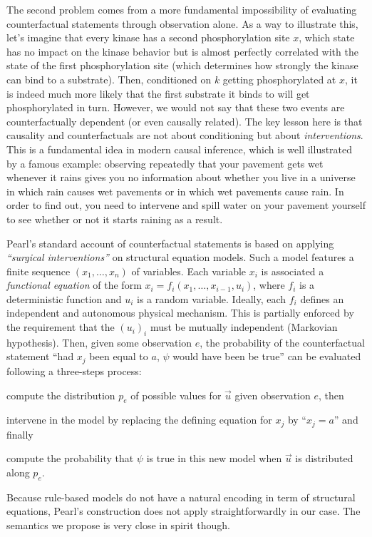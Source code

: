The second problem comes from a more fundamental impossibility of
evaluating counterfactual statements through observation alone. As a
way to illustrate this, let's imagine that every kinase has a second
phosphorylation site $x$, which state has no impact on the kinase
behavior but is almost perfectly correlated with the state of the
first phosphorylation site (which determines how strongly the kinase
can bind to a substrate). Then, conditioned on $k$ getting
phosphorylated at $x$, it is indeed much more likely that the first
substrate it binds to will get phosphorylated in turn. However, we
would not say that these two events are counterfactually dependent (or
even causally related). The key lesson here is that causality and
counterfactuals are not about conditioning but about
\emph{interventions}. This is a fundamental idea in modern causal
inference, which is well illustrated by a famous example: observing
repeatedly that your pavement gets wet whenever it rains gives you no
information about whether you live in a universe in which rain causes
wet pavements or in which wet pavements cause rain. In order to find
out, you need to intervene and spill water on your pavement yourself
to see whether or not it starts raining as a result.

Pearl's standard account of counterfactual statements is based on
applying \textit{``surgical interventions''} on structural equation
models. Such a model features a finite sequence $(x_1, \dots, x_n)$ of
variables. Each variable $x_i$ is associated a \emph{functional
  equation} of the form $x_i = f_i(x_1, \dots, x_{i-1}, u_i)$, where
$f_i$ is a deterministic function and $u_i$ is a random
variable. Ideally, each $f_i$ defines an independent and autonomous
physical mechanism. This is partially enforced by the requirement that
the $(u_i)_i$ must be mutually independent (Markovian
hypothesis). Then, given some observation $e$, the probability of the
counterfactual statement ``had $x_j$ been equal to $a$, $\psi$ would
have been be true'' can be evaluated following a three-steps process:
\begin{inparaenum}[]
\item \ItAbduction{} compute the distribution $p_e$ of possible values for
  $\vec u$ given observation $e$, then
\item \ItAction{} intervene in the model by replacing the
  defining equation for $x_j$ by ``$x_j = a$'' and finally
\item \ItPrediction{} compute the probability that $\psi$ is true in this
  new model when $\vec{u}$ is distributed along $p_e$.
\end{inparaenum}
Because rule-based models do not have a natural encoding in term of
structural equations, Pearl's construction does not apply
straightforwardly in our case. The semantics we propose is
very close in spirit though.



